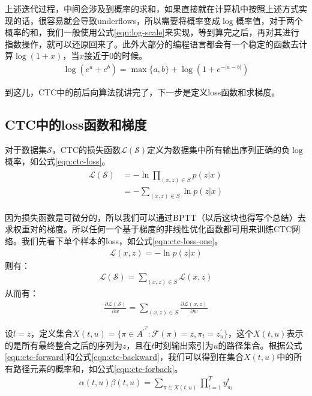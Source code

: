 {上述迭代过程，中间会涉及到概率的求和，如果直接就在计算机中按照上述方式实现的话，很容易就会导致underflows，所以需要将概率变成$\log$概率值，对于两个概率的和，我们一般使用公式\ref{eqn:log-scale}来实现，等到算完之后，再对其进行指数操作，就可以还原回来了。此外大部分的编程语言都会有一个稳定的函数去计算$\log(1+x)$，当$x$接近于0的时候。
\begin{align}
\label{eqn:log-scale}
  \log(e^{a}+e^{b}) = \max\{a, b\} + \log(1+e^{-|a-b|})
\end{align}

到这儿，CTC中的前后向算法就讲完了，下一步是定义loss函数和求梯度。

\subsection{CTC中的loss函数和梯度}
对于数据集$\mathcal{S}$，CTC的损失函数$\mathcal{L}(\mathcal{S})$定义为数据集中所有输出序列正确的负$\log$概率，如公式\ref{eqn:ctc-loss}。
\begin{align}
\label{eqn:ctc-loss}
  \begin{split}
    \mathcal{L}(\mathcal{S}) &= -\ln{\prod_{(x,z)\in{S}}}p(z|x) \\
                             &= -\sum_{(x,z)\in{S}}\ln p(z|x)
  \end{split}
\end{align}

因为损失函数是可微分的，所以我们可以通过BPTT（以后这块也得写个总结）去求权重对的梯度。所以任何一个基于梯度的非线性优化函数都可用来训练CTC网络。我们先看下单个样本的loss，如公式\ref{eqn:ctc-loss-one}。
\begin{align}
\label{eqn:ctc-loss-one}
  \mathcal{L}(x,z) = -\ln p(z|x)
\end{align}
则有：
\begin{align}
 \mathcal{L}(\mathcal{S}) = \sum_{(x,z)\in{S}}\mathcal{L}(x,z)
\end{align}
从而有：
\begin{align}
 \frac{\partial{\mathcal{L}(\mathcal{S})}}{\partial{w}} = \sum_{(x,z)\in{S}} \frac{\partial{\mathcal{L}(x,z)}}{\partial{w}}
\end{align}

设$l=z$，定义集合$X(t,u)=\{\pi\in{A^{'^{T}}}:\mathcal{F}(\pi)=z, \pi_{t}=z_{u}^{'}\}$，这个$X(t,u)$表示的是所有最终整合之后的序列为$z$，且在$t$时刻输出索引为$u$的路径集合。根据公式\ref{eqn:ctc-forward}和公式\ref{eqn:ctc-backward}，我们可以得到在集合$X(t,u)$中的所有路径元素的概率和，如公式\ref{eqn:ctc-forback}。
\begin{align}
\label{eqn:ctc-forback}
  \alpha(t,u)\beta(t,u) = \sum_{\pi\in{X(t,u)}}\prod_{t=1}^{T} y_{\pi_{t}}^{t}
\end{align}

}
